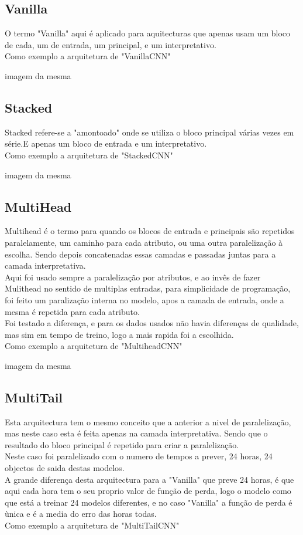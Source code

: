 \subsection{Vanilla \label{se:vannila}}

O termo "Vanilla" aqui é aplicado para aquitecturas que apenas usam um bloco de cada, um de entrada, um principal, e um interpretativo. \\
Como exemplo a arquitetura de "VanillaCNN"

imagem da mesma

\subsection{Stacked\label{se:stacked}}

Stacked refere-se a "amontoado" onde se utiliza o bloco principal várias vezes em série.E apenas um bloco de  entrada e um interpretativo. \\
Como exemplo a arquitetura de "StackedCNN"

imagem da mesma

\subsection{MultiHead\label{se:multihea}}

Multihead é o termo para quando os blocos de entrada e principais são repetidos paralelamente, um caminho para cada atributo, ou uma outra paralelização à escolha. Sendo depois concatenadas essas camadas e passadas juntas para a camada interpretativa. \\
Aqui foi usado sempre a paralelização por atributos, e ao invês de fazer Mulithead no sentido de multiplas entradas, para simplicidade de programação, foi feito um paralização interna no modelo, apos a camada de entrada, onde a mesma é repetida para cada atributo. \\
Foi testado a diferença, e para os dados usados não havia diferenças de qualidade, mas sim em tempo de treino, logo a mais rapida foi a escolhida. \\
Como exemplo a arquitetura de "MultiheadCNN"

imagem da mesma

\subsection{MultiTail\label{se:multitail}}

Esta arquitectura tem o mesmo conceito que a anterior a nivel de paralelização, mas neste caso esta é feita apenas na camada interpretativa. Sendo que o resultado do bloco principal é repetido para criar a paralelização. \\
Neste caso foi paralelizado com o numero de tempos a prever, 24 horas, 24 objectos de saida destas modelos.  \\
A grande diferença desta arquitectura para a "Vanilla" que preve 24 horas, é que aqui cada hora tem o seu proprio valor de função de perda, logo o modelo como que está a treinar 24 modelos diferentes, e no caso "Vanilla" a função de perda é ùnica e é a media do erro das horas todas. \\
Como exemplo a arquitetura de "MultiTailCNN"

